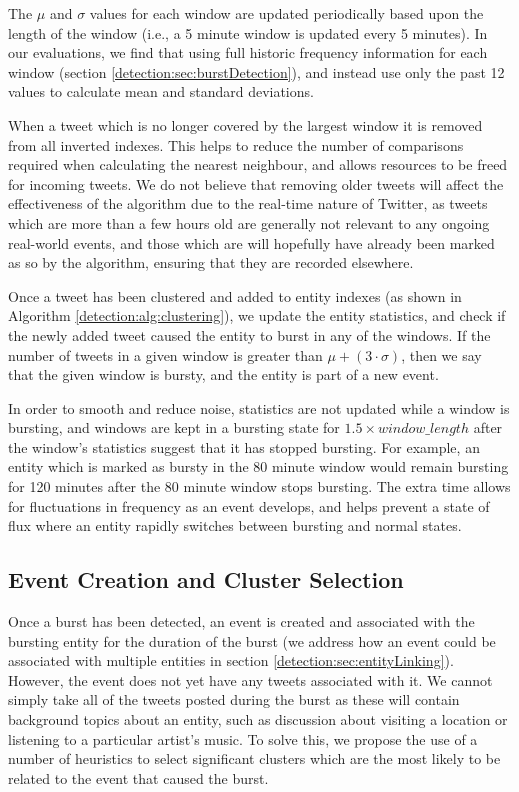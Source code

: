 The \(\mu\) and \(\sigma\) values for each window are updated periodically based upon the length of the window (i.e., a 5 minute window is updated every 5 minutes).
In our evaluations, we find that using full historic frequency information for each window (section \ref{detection:sec:burstDetection}), and instead use only the past 12 values to calculate mean and standard deviations.

When a tweet which is no longer covered by the largest window it is removed from all inverted indexes. This helps to reduce the number of comparisons required when calculating the nearest neighbour, and allows resources to be freed for incoming tweets. We do not believe that removing older tweets will affect the effectiveness of the algorithm due to the real-time nature of Twitter, as tweets which are more than a few hours old are generally not relevant to any ongoing real-world events, and those which are will hopefully have already been marked as so by the algorithm, ensuring that they are recorded elsewhere.

Once a tweet has been clustered and added to entity indexes (as shown in Algorithm \ref{detection:alg:clustering}), we update the entity statistics, and check if the newly added tweet caused the entity to burst in any of the windows. If the number of tweets in a given window is greater than \(\mu + (3 \cdot \sigma)\), then we say that the given window is bursty, and the entity is part of a new event.

In order to smooth and reduce noise, statistics are not updated while a window is bursting, and windows are kept in a bursting state for \(1.5 \times window\_length\) after the window's statistics suggest that it has stopped bursting. For example, an entity which is marked as bursty in the 80 minute window would remain bursting for 120 minutes after the 80 minute window stops bursting.  The extra time allows for fluctuations in frequency as an event develops, and helps prevent a state of flux where an entity rapidly switches between bursting and normal states.

\subsection{Event Creation and Cluster Selection}
\label{detection:sec:eventCreation}
Once a burst has been detected, an event is created and associated with the bursting entity for the duration of the burst (we address how an event could be associated with multiple entities in section \ref{detection:sec:entityLinking}).
However, the event does not yet have any tweets associated with it.
We cannot simply take all of the tweets posted during the burst as these will contain background topics about an entity, such as discussion about visiting a location or listening to a particular artist's music. To solve this, we propose the use of a number of heuristics to select significant clusters which are the most likely to be related to the event that caused the burst.

